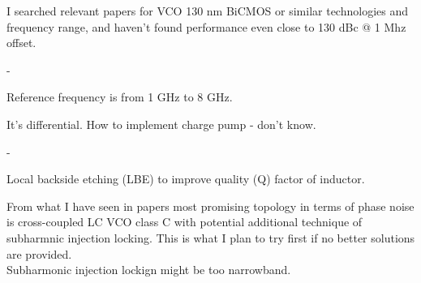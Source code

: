 \documentclass{article}
\begin{document}
I searched relevant papers for VCO 130 nm BiCMOS or similar technologies and frequency range, and haven't found performance even close to 130 dBc @ 1 Mhz offset. 

\begin{question}
	-
\end{question}

\begin{question}
	Reference frequency is from 1 GHz to 8 GHz.
\end{question}

\begin{question}
	It's differential. How to implement charge pump - don't know.
\end{question}

\begin{question}
	-
\end{question}

\begin{question}
	Local backside etching (LBE) to improve quality (Q) factor of inductor. 
\end{question}

\begin{info}
	From what I have seen in papers  most promising topology in terms of phase noise is cross-coupled LC VCO class C with potential additional technique of subharmnic injection locking. This is what I plan to try first if no better solutions are provided. \\
	Subharmonic injection lockign might be too narrowband.
\end{info}

\end{document}
